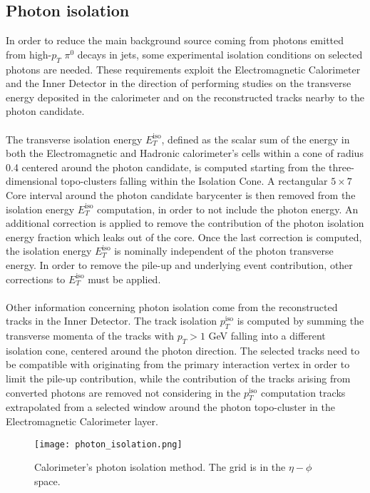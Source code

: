\subsection{Photon isolation}
In order to reduce the main background source coming from photons emitted from high-$p_T$ $\pi^0$ decays in jets, some experimental isolation conditions on selected photons are needed. These requirements exploit the Electromagnetic Calorimeter and the Inner Detector in the direction of performing studies on the transverse energy deposited in the calorimeter and on the reconstructed tracks nearby to the photon candidate.
\\\\
The transverse isolation energy $E_T^{\text{iso}}$, defined as the scalar sum of the energy in both the Electromagnetic and Hadronic calorimeter's cells within a cone of radius 0.4 centered around the photon candidate, is computed starting from the three-dimensional topo-clusters falling within the Isolation Cone. A rectangular $5 \times 7$ Core interval around the photon candidate barycenter is then removed from the isolation energy $E_T^{\text{iso}}$ computation, in order to not include the photon energy. An additional correction is applied to remove the contribution of the photon isolation energy fraction which leaks out of the core. Once the last correction is computed, the isolation energy $E_T^{\text{iso}}$ is nominally independent of the photon transverse energy. In order to remove the pile-up and underlying event contribution, other corrections to $E_T^{\text{iso}}$ must be applied.
\\\\
Other information concerning photon isolation come from the reconstructed tracks in the Inner Detector. The track isolation $p_T^{\text{iso}}$ is computed by summing the transverse momenta of the tracks with $p_T > 1$ GeV falling into a different isolation cone, centered around the photon direction. The selected tracks need to be compatible with originating from the primary interaction vertex in order to limit the pile-up contribution, while the contribution of the tracks arising from converted photons are removed not considering in the $p_T^{\text{iso}}$ computation tracks extrapolated from a selected window around the photon topo-cluster in the Electromagnetic Calorimeter  layer.
\begin{figure}[b!]
\hspace{1.5cm}\texttt{[image: photon\_isolation.png]}
\caption{Calorimeter's photon isolation method. The grid is in the $\eta - \phi$ space.}
\end{figure}

